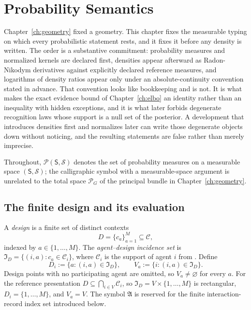 \chapter{Probability Semantics}
\label{ch:probability}

Chapter~\ref{ch:geometry} fixed a geometry. This chapter fixes the measurable typing on which every probabilistic statement rests, and it fixes it before any density is written. The order is a substantive commitment: probability measures and normalized kernels are declared first, densities appear afterward as Radon-Nikodym derivatives against explicitly declared reference measures, and logarithms of density ratios appear only under an absolute-continuity convention stated in advance. That convention looks like bookkeeping and is not. It is what makes the exact evidence bound of Chapter~\ref{ch:elbo} an identity rather than an inequality with hidden exceptions, and it is what later forbids degenerate recognition laws whose support is a null set of the posterior. A development that introduces densities first and normalizes later can write those degenerate objects down without noticing, and the resulting statements are false rather than merely imprecise.

Throughout, $\mathcal P(\mathsf S,\mathscr S)$ denotes the set of probability measures on a measurable space $(\mathsf S,\mathscr S)$; the calligraphic symbol with a measurable-space argument is unrelated to the total space $\mathscr P_G$ of the principal bundle in Chapter~\ref{ch:geometry}.

\section{The finite design and its evaluation}
\label{sec:prob-design}

\medskip
{}
A \emph{design} is a finite set of distinct contexts
\begin{equation}
D=\{c_a\}_{a=1}^{M}\subseteq\mathcal C,
\label{eq:prob-design}
\end{equation}
indexed by $a\in\{1,\dots,M\}$. The \emph{agent--design incidence set} is $\mathfrak I_D=\{(i,a):c_a\in\mathcal C_i\}$, where $\mathcal C_i$ is the support of agent $i$ from . Define
\[
D_i:=\{a:(i,a)\in\mathfrak I_D\},
\qquad
V_a:=\{i:(i,a)\in\mathfrak I_D\}.
\]
Design points with no participating agent are omitted, so $V_a\neq\varnothing$ for every $a$. For the reference presentation $D\subseteq\bigcap_{i\in V}\mathcal C_i$, so $\mathfrak I_D=V\times\{1,\dots,M\}$ is rectangular, $D_i=\{1,\dots,M\}$, and $V_a=V$. The symbol $\mathfrak A$ is reserved for the finite interaction-record index set introduced below. 
\medskip


